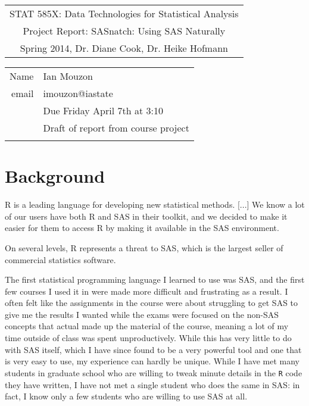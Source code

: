 \documentclass[10pt]{report}
\makeatletter
\newcommand{\blue}[1]{{\color{blue} #1}}
\def\Semester{Spring 2014} %
\def\GroupShort{STAT 585X}
\def\thistitle{Project Report: SASnatch: Using SAS Naturally}%
\def\GroupLong{Data Technologies for Statistical Analysis}
\def\GroupLeaderLong{Dr. Diane Cook, Dr. Heike Hofmann}
\def\AuthorName{Ian Mouzon}
\def\AuthorContact{\blue{imouzon@iastate}}
\def\theseInstructions{Due Friday April 7th at 3:10}
\def\Assignment{Draft of report from course project}
\def\titleheader{
   \thispagestyle{empty}%
   \begin{center}%
   \renewcommand{\arraystretch}{1.5}%
   \begin{tabular}{c}%
      \Large{\GroupShort: \GroupLong} \\
      \thistitle \\
      \Semester, \GroupLeaderLong\\
   \end{tabular}
   \end{center}

   \begin{center}
   \renewcommand{\arraystretch}{1.5}
      \begin{tabular*}{0.65\textwidth}{r@{:\hspace{.3cm}}l}
   \hline
   Name& \AuthorName\\
   email& \AuthorContact  \\
   \ifdefempty{\theseInstructions}{}{Instructions&  \theseInstructions \\}
   \ifdefempty{\Assignment}{}{Assignment& \Assignment \\}
   \hline
   \end{tabular*}
   \end{center}
}
\makeatother
\begin{document}
%





\titleheader{}

\section{Background}
\begin{fquote}
R is a leading language for developing new statistical methods. [...]
We know a lot of our users have both R and SAS in their toolkit, 
and we decided to make it easier for them to access R by making 
it available in the SAS environment.
\end{fquote}

\begin{fquote}
On several levels, R represents a threat to SAS, which is the largest seller of commercial statistics software.
\end{fquote}

The first statistical programming language I learned to use was SAS, and the 
first few courses I used it in were made more difficult and frustrating as a result. 
I often felt like the assignments in the course were about struggling to get SAS to give
me the results I wanted while the exams were focused on the non-SAS concepts 
that actual made up the material of the course, meaning a lot of my time 
outside of class was spent unproductively. While this has very little to do with
SAS itself, which I have since found to be a very powerful tool and one that
is very easy to use, my experience can hardly be unique. While I have met many students
in graduate school who are willing to tweak minute details in the \verb!R! code they have
written, I have not met a single student who does the same in SAS: in fact, I 
know only a few students who are willing to use SAS at all.
\end{document}
